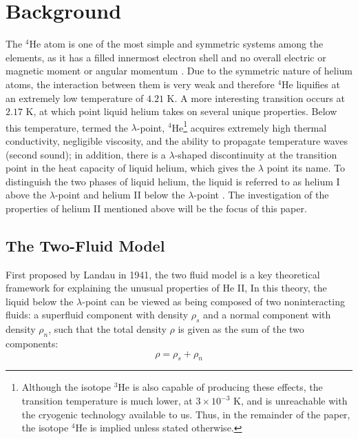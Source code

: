 
\section{Background}\label{background}

The $^4$He atom is one of the most simple and symmetric systems
among the elements, as it has a filled innermost electron shell and no
overall electric or magnetic moment or angular momentum
\cite{atkins}. Due to the symmetric nature of helium atoms, the
interaction between them is very weak and therefore $^4$He liquifies
at an extremely low temperature of $4.21$ K. A more
interesting transition occurs at $2.17$ K, at which point liquid
helium takes on several unique properties. Below this temperature,
termed the $\lambda$-point, $^4$He\footnote{Although the isotope
  $^3$He is also capable of producing these effects, the transition
  temperature is much lower, at $3\times 10^{-3}$ K, and is
  unreachable with the cryogenic technology available to us. Thus, in
  the remainder of the paper, the isotope $^4$He is implied unless
  stated otherwise.}  acquires extremely high thermal conductivity,
negligible viscosity, and the ability to propagate temperature waves
(second sound); in addition, there is a $\lambda$-shaped discontinuity
at the transition point in the heat capacity of liquid helium, which
gives the $\lambda$ point its name. To distinguish the two phases of
liquid helium, the liquid is referred to as helium I above the
$\lambda$-point and helium II below the $\lambda$-point
\cite{tilley}. The investigation of the properties of helium II
mentioned above will be the focus of this paper.

\subsection{The Two-Fluid Model}\label{thetwofluidmodel}

First proposed by Landau in 1941\cite{landau}, the two fluid model 
is a key theoretical framework for explaining the
unusual properties of He II, In this theory, the liquid below the $\lambda$-point
can be viewed as being composed of two noninteracting fluids: a
superfluid component with density $\rho_s$ and a normal component with
density $\rho_n$, such that the total density $\rho$ is given as the
sum of the two components:
\begin{equation}
\rho = \rho_s + \rho_n
\label{eqn:density}
\end{equation}

